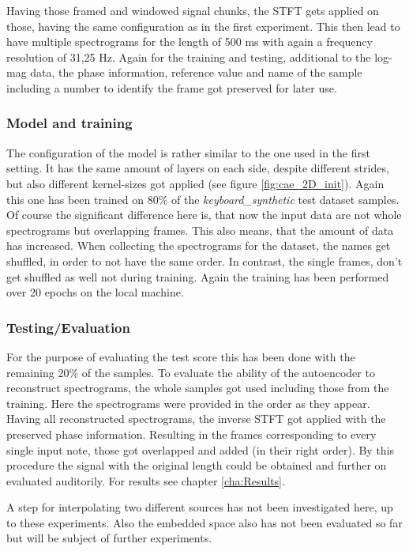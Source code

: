 Having those framed and windowed signal chunks, the STFT gets applied on those, having the same configuration as in the first experiment. This then lead to have multiple spectrograms for the length of 500 ms with again a frequency resolution of 31,25 Hz. Again for the training and testing, additional to the log-mag data, the phase information, reference value and name of the sample including a number to identify the frame got preserved for later use.

\subsubsection{Model and training}
The configuration of the model is rather similar to the one used in the first setting. It has the same amount of layers on each side, despite different strides, but also different kernel-sizes got applied (see figure \ref{fig:cae_2D_init}). Again this one has been trained on 80\% of the \textit{keyboard\_synthetic} test dataset samples. Of course the significant difference here is, that now the input data are not whole spectrograms but overlapping frames. This also means, that the amount of data has increased. When collecting the spectrograms for the dataset, the names get shuffled, in order to not have the same order. In contrast, the single frames, don't get shuffled as well not during training. Again the training has been performed over 20 epochs on the local machine.

\subsubsection{Testing/Evaluation}
For the purpose of evaluating the test score this has been done with the remaining 20\% of the samples. To evaluate the ability of the autoencoder to reconstruct spectrograms, the whole samples got used including those from the training. Here the spectrograms were provided in the order as they appear. Having all reconstructed spectrograms, the inverse STFT got applied with the preserved phase information. Resulting in the frames corresponding to every single input note, those got overlapped and added (in their right order). By this procedure the signal with the original length could be obtained and further on evaluated auditorily. For results see chapter \ref{cha:Results}. 

A step for interpolating two different sources has not been investigated here, up to these experiments. Also the embedded space also has not been evaluated so far but will be subject of further experiments.

